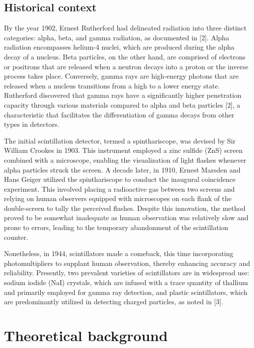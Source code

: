\documentclass[10pt,letterpaper,onecolumn]{article}
\begin{document}
\subsection{Historical context}
By the year 1902, Ernest Rutherford had delineated radiation into three 
distinct categories: alpha, beta, and gamma radiation, as documented in [2]. 
Alpha radiation encompasses helium-4 nuclei, which are produced during the alpha 
decay of a nucleus. Beta particles, on the other hand, are comprised of electrons or 
positrons that are released when a neutron decays into a proton or the inverse process 
takes place. Conversely, gamma rays are high-energy photons that are released when a 
nucleus transitions from a high to a lower energy state. Rutherford discovered that gamma
 rays have a significantly higher penetration capacity through various materials 
 compared to alpha and beta particles [2], a characteristic that facilitates the
  differentiation of gamma decays from other types in detectors.

The initial scintillation detector, termed a spinthariscope, was devised by Sir 
William Crookes in 1903. This instrument employed a zinc sulfide (ZnS) screen 
combined with a microscope, enabling the visualization of light flashes whenever 
alpha particles struck the screen. A decade later, in 1910, Ernest Marsden and 
Hans Geiger utilized the spinthariscope to conduct the inaugural coincidence experiment. 
This involved placing a radioactive gas between two screens and relying on human 
observers equipped with microscopes on each flank of the double-screen to tally the 
perceived flashes. Despite this innovation, the method proved to be somewhat 
inadequate as human observation was relatively slow and prone to errors, leading to 
the temporary abandonment of the scintillation counter.

Nonetheless, in 1944, scintillators made a comeback, this time incorporating 
photomultipliers to supplant human observation, thereby enhancing accuracy and 
reliability. Presently, two prevalent varieties of scintillators are in widespread use: 
sodium iodide (NaI) crystals, which are infused with a trace quantity of thallium and 
primarily employed for gamma ray detection, and plastic scintillators, which are 
predominantly utilized in detecting charged particles, as noted in [3].





\section{Theoretical background}
\end{document}

